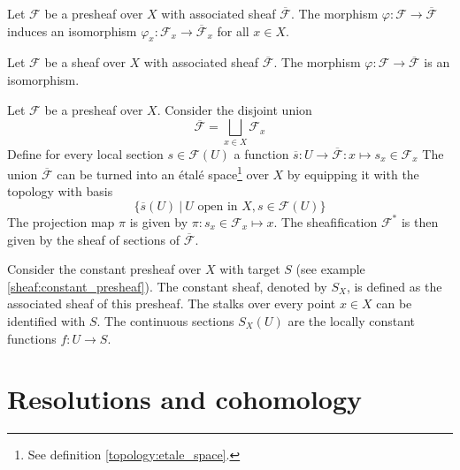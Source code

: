 	\begin{property}
		Let $\mathcal{F}$ be a presheaf over $X$ with associated sheaf $\overline{\mathcal{F}}$. The morphism $\varphi:\mathcal{F}\rightarrow\overline{\mathcal{F}}$ induces an isomorphism $\varphi_x:\mathcal{F}_x\rightarrow\overline{\mathcal{F}}_x$ for all $x\in X$.
	\end{property}
	\begin{property}
		Let $\mathcal{F}$ be a sheaf over $X$ with associated sheaf $\overline{\mathcal{F}}$. The morphism $\varphi:\mathcal{F}\rightarrow\overline{\mathcal{F}}$ is an isomorphism.
	\end{property}
	
	\begin{construct}\label{sheaf:etale_construction}
		Let $\mathcal{F}$ be a presheaf over $X$. Consider the disjoint union
		\begin{equation}
			\overline{\mathcal{F}} = \bigsqcup_{x\in X}\mathcal{F}_x
		\end{equation}
		Define for every local section $s\in\mathcal{F}(U)$ a function $\overline{s}:U\rightarrow\overline{\mathcal{F}}:x\mapsto s_x\in\mathcal{F}_x$ The union $\overline{\mathcal{F}}$ can be turned into an \'etal\'e space\footnote{See definition \ref{topology:etale_space}.} over $X$ by equipping it with the topology with basis
		\begin{equation}
			\{\overline{s}(U)\ |\ U\text{ open in }X, s\in\mathcal{F}(U)\}
		\end{equation}
		The projection map $\pi$ is given by $\pi:s_x\in\mathcal{F}_x\mapsto x$. The sheafification $\mathcal{F}^\ast$ is then given by the sheaf of sections of $\overline{\mathcal{F}}$.
	\end{construct}
	
	\begin{example}
		Consider the constant presheaf over $X$ with target $S$ (see example \ref{sheaf:constant_presheaf}). The constant sheaf, denoted by $S_X$, is defined as the associated sheaf of this presheaf. The stalks over every point $x\in X$ can be identified with $S$. The continuous sections $S_X(U)$ are the locally constant functions $f:U\rightarrow S$.
	\end{example}
	
\section{Resolutions and cohomology}

